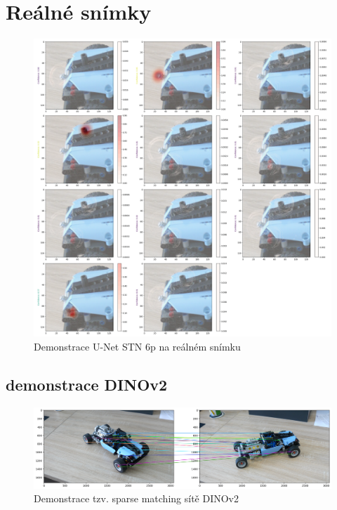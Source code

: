\section{Reálné snímky}
\label{sec:Chapter64}

\begin{figure}[ht]
\centering
\includegraphics[width=1.0\textwidth,keepaspectratio]{Figures/real/real_3.png}
\caption[Demonstrace U-Net STN 6p na reálném snímku]{Demonstrace U-Net STN 6p na reálném snímku}
\label{fig:real_0}
\end{figure}

\subsection{demonstrace DINOv2}

\begin{figure}[H]
\centering
\includegraphics[width=1.0\textwidth,keepaspectratio]{Figures/dinov2demo.png}
\caption[Demonstrace tzv. sparse matching sítě DINOv2]{Demonstrace tzv. sparse matching sítě DINOv2}
\label{fig:nets_false_detections}
\end{figure}
\endinput